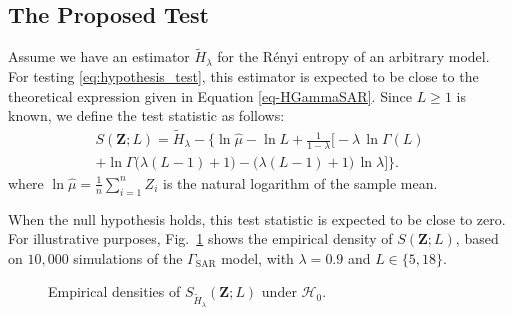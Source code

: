 \documentclass[
  journal,
]{IEEEtran}%
\begin{document}
\subsection{The Proposed Test}\label{the-proposed-test}

Assume we have an estimator \(\widetilde{H}_{\lambda}\) for the Rényi
entropy of an arbitrary model. For testing \eqref{eq:hypothesis_test},
this estimator is expected to be close to the theoretical expression
given in Equation \eqref{eq-HGammaSAR}. Since \(L\geq1\) is known, we
define the test statistic as follows: \begin{multline}
\label{eq-test}
S(\bm{Z}; L) = \widetilde{H}_{\lambda} - \bigl\{\ln \widehat{\mu} - \ln L + \frac{1}{1-\lambda}
\bigl[-\lambda\,\ln\Gamma(L) \\  
+ \ln\Gamma\bigl(\lambda(L-1)+1\bigr)  
- \bigl(\lambda(L-1)+1\bigr)\,\ln\lambda
\bigr]\bigr\}.
\end{multline} where
\(\ln \widehat{\mu}={\textstyle\frac{1}{n}\sum_{i=1}^n Z_{i}}\) is the
natural logarithm of the sample mean.

When the null hypothesis holds, this test statistic is expected to be
close to zero. For illustrative purposes,
Fig.~\ref{fig-density_entropyR} shows the empirical density of
\(S(\bm{Z}; L)\), based on \(10,000\) simulations of the
\(\Gamma_{\text{SAR}}\) model, with \(\lambda=0.9\) and
\(L \in \{5,18\}\).

\begin{figure}[hbt]


\caption{\label{fig-density_entropyR}Empirical densities of
\(S_{\widetilde{H}_{\lambda}}(\bm{Z}; L)\) under \(\mathcal{H}_0\).}

\end{figure}%
\end{document}
